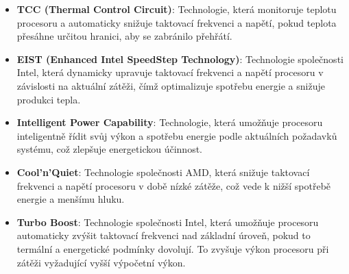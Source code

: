 \begin{itemize}
\item \textbf{TCC (Thermal Control Circuit)}: Technologie, která monitoruje teplotu procesoru a automaticky snižuje taktovací frekvenci a napětí, pokud teplota přesáhne určitou hranici, aby se zabránilo přehřátí.
\item \textbf{EIST (Enhanced Intel SpeedStep Technology)}: Technologie společnosti Intel, která dynamicky upravuje taktovací frekvenci a napětí procesoru v závislosti na aktuální zátěži, čímž optimalizuje spotřebu energie a snižuje produkci tepla.
\item \textbf{Intelligent Power Capability}: Technologie, která umožňuje procesoru inteligentně řídit svůj výkon a spotřebu energie podle aktuálních požadavků systému, což zlepšuje energetickou účinnost.
\item \textbf{Cool'n'Quiet}: Technologie společnosti AMD, která snižuje taktovací frekvenci a napětí procesoru v době nízké zátěže, což vede k nižší spotřebě energie a menšímu hluku.
\item \textbf{Turbo Boost}: Technologie společnosti Intel, která umožňuje procesoru automaticky zvýšit taktovací frekvenci nad základní úroveň, pokud to termální a energetické podmínky dovolují. To zvyšuje výkon procesoru při zátěži vyžadující vyšší výpočetní výkon.
\end{itemize}
